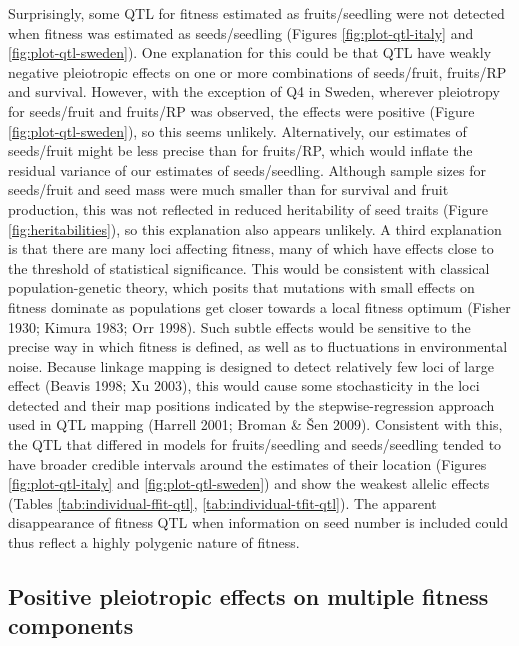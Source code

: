 \documentclass[]{article}
\begin{document}
Surprisingly, some QTL for fitness estimated as fruits/seedling were not detected when fitness was estimated as seeds/seedling (Figures \ref{fig:plot-qtl-italy} and \ref{fig:plot-qtl-sweden}). One explanation for this could be that QTL have weakly negative pleiotropic effects on one or more combinations of seeds/fruit, fruits/RP and survival. However, with the exception of Q4 in Sweden, wherever pleiotropy for seeds/fruit and fruits/RP was observed, the effects were positive (Figure \ref{fig:plot-qtl-sweden}), so this seems unlikely. Alternatively, our estimates of seeds/fruit might be less precise than for fruits/RP, which would inflate the residual variance of our estimates of seeds/seedling. Although sample sizes for seeds/fruit and seed mass were much smaller than for survival and fruit production, this was not reflected in reduced heritability of seed traits (Figure \ref{fig:heritabilities}), so this explanation also appears unlikely. A third explanation is that there are many loci affecting fitness, many of which have effects close to the threshold of statistical significance. This would be consistent with classical population-genetic theory, which posits that mutations with small effects on fitness dominate as populations get closer towards a local fitness optimum (Fisher 1930; Kimura 1983; Orr 1998). Such subtle effects would be sensitive to the precise way in which fitness is defined, as well as to fluctuations in environmental noise. Because linkage mapping is designed to detect relatively few loci of large effect (Beavis 1998; Xu 2003), this would cause some stochasticity in the loci detected and their map positions indicated by the stepwise-regression approach used in QTL mapping (Harrell 2001; Broman \& Šen 2009). Consistent with this, the QTL that differed in models for fruits/seedling and seeds/seedling tended to have broader credible intervals around the estimates of their location (Figures \ref{fig:plot-qtl-italy} and \ref{fig:plot-qtl-sweden}) and show the weakest allelic effects (Tables \ref{tab:individual-ffit-qtl}, \ref{tab:individual-tfit-qtl}). The apparent disappearance of fitness QTL when information on seed number is included could thus reflect a highly polygenic nature of fitness.

\hypertarget{positive-pleiotropic-effects-on-multiple-fitness-components}{%
\subsection{Positive pleiotropic effects on multiple fitness components}\label{positive-pleiotropic-effects-on-multiple-fitness-components}}
\end{document}
